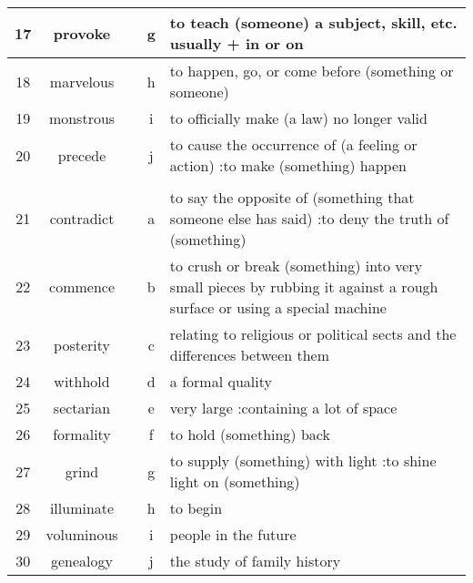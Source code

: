 \documentclass[a4paper]{article}
\begin{document}
\begin{center}
\begin{tabular}{|c|c|c|c|m{}|}
\hline
 17 & provoke & & g &  to teach (someone) a subject, skill, etc. usually + in or on \\
\hline
 18 & marvelous & & h &  to happen, go, or come before (something or someone) \\
\hline
 19 & monstrous & & i &  to officially make (a law) no longer valid \\
\hline
 20 & precede & & j &  to cause the occurrence of (a feeling or action) :to make (something) happen \\
\hline
 & & & & \\
\hline
 21 & contradict & & a &  to say the opposite of (something that someone else has said) :to deny the truth of (something) \\
\hline
 22 & commence & & b &  to crush or break (something) into very small pieces by rubbing it against a rough surface or using a special machine \\
\hline
 23 & posterity & & c &  relating to religious or political sects and the differences between them \\
\hline
 24 & withhold & & d &  a formal quality \\
\hline
 25 & sectarian & & e &  very large :containing a lot of space \\
\hline
 26 & formality & & f &  to hold (something) back \\
\hline
 27 & grind & & g &  to supply (something) with light :to shine light on (something) \\
\hline
 28 & illuminate & & h &  to begin \\
\hline
 29 & voluminous & & i &  people in the future \\
\hline
 30 & genealogy & & j &  the study of family history \\
\hline
\end{tabular}
\end{center}
\end{document}
